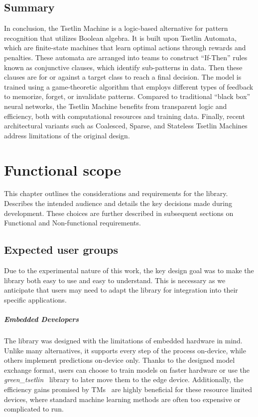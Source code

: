 \documentclass[english]{aghengthesis} %
\newcommand*{\GreenTsetlinName}{\emph{green\_tsetlin}~\cite{glimsdal2024greentsetlin} }
\begin{document}
\section{Summary}
In conclusion, the Tsetlin Machine is a logic-based alternative for pattern recognition that utilizes Boolean algebra. It is built upon Tsetlin Automata, which are finite-state machines that learn optimal actions through rewards and penalties. These automata are arranged into teams to construct ``If-Then'' rules known as conjunctive clauses, which identify sub-patterns in data. Then these clauses are for or against a target class to reach a final decision. The model is trained using a game-theoretic algorithm that employs different types of feedback to memorize, forget, or invalidate patterns. Compared to traditional ``black box'' neural networks, the Tsetlin Machine benefits from transparent logic and efficiency, both with computational resources and training data. Finally, recent architectural variants such as Coalesced, Sparse, and Stateless Tsetlin Machines address limitations of the original design.


\chapter{Functional scope}
\label{chap:functional-scope}


This chapter outlines the considerations and requirements for the library. Describes the intended audience and details the key decisions made during development. These choices are further described in subsequent sections on Functional and Non-functional requirements.

\section{Expected user groups}
Due to the experimental nature of this work, the key design goal was to make the library both easy to use and easy to understand. This is necessary as we anticipate that users may need to adapt the library for integration into their specific applications.

\paragraph{Embedded Developers}
The library was designed with the limitations of embedded hardware in mind. Unlike many alternatives, it supports every step of the process on-device, while others implement predictions on-device only. Thanks to the designed model exchange format, users can choose to train models on faster hardware or use the \GreenTsetlinName library to later move them to the edge device. Additionally, the efficiency gains promised by TMs~\cite{granmo2021tsetlinmachinegame} are highly beneficial for these resource limited devices, where standard machine learning methods are often too expensive or complicated to run.
\end{document}
